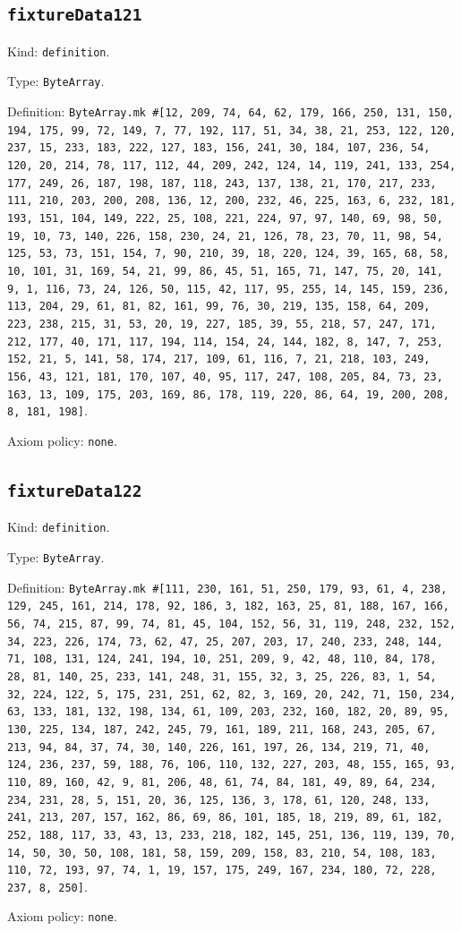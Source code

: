\documentclass[11pt]{article}
\begin{document}
\subsection*{\texttt{fixtureData121}}
\noindent Kind: \texttt{definition}.\par
\noindent Type: \texttt{ByteArray}.\par
\noindent Definition: \texttt{ByteArray.mk \#[12, 209, 74, 64, 62, 179, 166, 250, 131, 150, 194, 175, 99, 72, 149, 7, 77, 192, 117, 51, 34, 38, 21, 253, 122, 120, 237, 15, 233, 183, 222, 127, 183, 156, 241, 30, 184, 107, 236, 54, 120, 20, 214, 78, 117, 112, 44, 209, 242, 124, 14, 119, 241, 133, 254, 177, 249, 26, 187, 198, 187, 118, 243, 137, 138, 21, 170, 217, 233, 111, 210, 203, 200, 208, 136, 12, 200, 232, 46, 225, 163, 6, 232, 181, 193, 151, 104, 149, 222, 25, 108, 221, 224, 97, 97, 140, 69, 98, 50, 19, 10, 73, 140, 226, 158, 230, 24, 21, 126, 78, 23, 70, 11, 98, 54, 125, 53, 73, 151, 154, 7, 90, 210, 39, 18, 220, 124, 39, 165, 68, 58, 10, 101, 31, 169, 54, 21, 99, 86, 45, 51, 165, 71, 147, 75, 20, 141, 9, 1, 116, 73, 24, 126, 50, 115, 42, 117, 95, 255, 14, 145, 159, 236, 113, 204, 29, 61, 81, 82, 161, 99, 76, 30, 219, 135, 158, 64, 209, 223, 238, 215, 31, 53, 20, 19, 227, 185, 39, 55, 218, 57, 247, 171, 212, 177, 40, 171, 117, 194, 114, 154, 24, 144, 182, 8, 147, 7, 253, 152, 21, 5, 141, 58, 174, 217, 109, 61, 116, 7, 21, 218, 103, 249, 156, 43, 121, 181, 170, 107, 40, 95, 117, 247, 108, 205, 84, 73, 23, 163, 13, 109, 175, 203, 169, 86, 178, 119, 220, 86, 64, 19, 200, 208, 8, 181, 198]}.\par
\noindent Axiom policy: \texttt{none}.\par
\subsection*{\texttt{fixtureData122}}
\noindent Kind: \texttt{definition}.\par
\noindent Type: \texttt{ByteArray}.\par
\noindent Definition: \texttt{ByteArray.mk \#[111, 230, 161, 51, 250, 179, 93, 61, 4, 238, 129, 245, 161, 214, 178, 92, 186, 3, 182, 163, 25, 81, 188, 167, 166, 56, 74, 215, 87, 99, 74, 81, 45, 104, 152, 56, 31, 119, 248, 232, 152, 34, 223, 226, 174, 73, 62, 47, 25, 207, 203, 17, 240, 233, 248, 144, 71, 108, 131, 124, 241, 194, 10, 251, 209, 9, 42, 48, 110, 84, 178, 28, 81, 140, 25, 233, 141, 248, 31, 155, 32, 3, 25, 226, 83, 1, 54, 32, 224, 122, 5, 175, 231, 251, 62, 82, 3, 169, 20, 242, 71, 150, 234, 63, 133, 181, 132, 198, 134, 61, 109, 203, 232, 160, 182, 20, 89, 95, 130, 225, 134, 187, 242, 245, 79, 161, 189, 211, 168, 243, 205, 67, 213, 94, 84, 37, 74, 30, 140, 226, 161, 197, 26, 134, 219, 71, 40, 124, 236, 237, 59, 188, 76, 106, 110, 132, 227, 203, 48, 155, 165, 93, 110, 89, 160, 42, 9, 81, 206, 48, 61, 74, 84, 181, 49, 89, 64, 234, 234, 231, 28, 5, 151, 20, 36, 125, 136, 3, 178, 61, 120, 248, 133, 241, 213, 207, 157, 162, 86, 69, 86, 101, 185, 18, 219, 89, 61, 182, 252, 188, 117, 33, 43, 13, 233, 218, 182, 145, 251, 136, 119, 139, 70, 14, 50, 30, 50, 108, 181, 58, 159, 209, 158, 83, 210, 54, 108, 183, 110, 72, 193, 97, 74, 1, 19, 157, 175, 249, 167, 234, 180, 72, 228, 237, 8, 250]}.\par
\noindent Axiom policy: \texttt{none}.\par
\end{document}
